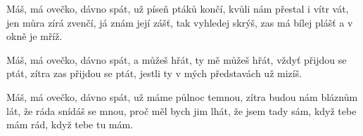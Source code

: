 
\beginverse{}
Máš, má ovečko, dávno spát, už píseň ptáků končí,
kvůli nám přestal i vítr vát, jen můra zírá zvenčí,
já znám její zášť, tak vyhledej skrýš,
zas má bílej plášť a v okně je mříž.
\endverse{}

\beginchorus{}
Máš, má ovečko, dávno spát,
a můžeš hřát, ty mě můžeš hřát,
vždyť přijdou se ptát, zítra zas přijdou se ptát,
jestli ty v mých představách už mizíš.
\endchorus{}

\beginverse{}
Máš, má ovečko, dávno spát, už máme půlnoc temnou,
zítra budou nám bláznům lát, že ráda snídáš se mnou,
proč měl bych jim lhát, že jsem tady sám,
když tebe mám rád, když tebe tu mám.
\endverse{}

\beginchorus{}

\endchorus{}

\endsong{}
